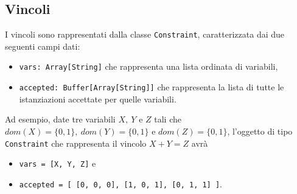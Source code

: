 \subsection{Vincoli}
I vincoli sono rappresentati dalla classe \texttt{Constraint}, caratterizzata dai due seguenti campi dati:
\begin{itemize}
\item \texttt{vars: Array[String]} che rappresenta una lista ordinata di variabili,
\item \texttt{accepted: Buffer[Array[String]]} che rappresenta la lista di tutte le
istanziazioni accettate per quelle variabili.
\end{itemize}


Ad esempio, date tre variabili $X,\ Y$ e $Z$ tali che $dom(X)=\{0,1\},\ dom(Y)=\{0,1\}$ e $dom(Z)=\{0,1\}$, l'oggetto di tipo \texttt{Constraint} che
rappresenta il vincolo $X+Y=Z$ avrà
\begin{itemize}
  \item \texttt{vars = [X, Y, Z]} e 
  \item \texttt{accepted = [ [0, 0, 0], [1, 0, 1], [0, 1, 1] ]}.
\end{itemize}

